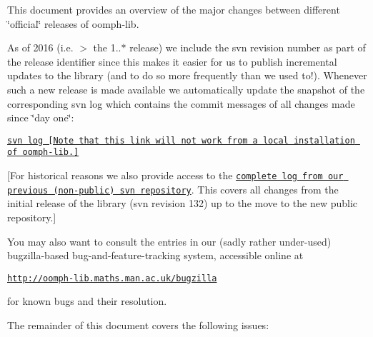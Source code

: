 This document provides an overview of the major changes between different \char`\"{}official\char`\"{} releases of {\ttfamily oomph-\/lib}.

As of 2016 (i.\+e. $>$ the 1..$\ast$ release) we include the svn revision number as part of the release identifier since this makes it easier for us to publish incremental updates to the library (and to do so more frequently than we used to!). Whenever such a new release is made available we automatically update the snapshot of the corresponding svn log which contains the commit messages of all changes made since \char`\"{}day one\char`\"{}\+:

\begin{center} \href{../../svn_log.txt}{\tt svn log \mbox{[}Note that this link will not work from a local installation of oomph-\/lib.\mbox{]}} \end{center} 

\mbox{[}For historical reasons we also provide access to the \href{../final_svn_log.txt}{\tt complete log from our previous (non-\/public) svn repository}. This covers all changes from the initial release of the library (svn revision 132) up to the move to the new public repository.\mbox{]}

You may also want to consult the entries in our (sadly rather under-\/used) bugzilla-\/based bug-\/and-\/feature-\/tracking system, accessible online at

\begin{center} \href{http://oomph-lib.maths.man.ac.uk/bugzilla}{\tt http\+://oomph-\/lib.\+maths.\+man.\+ac.\+uk/bugzilla} \end{center} 

for known bugs and their resolution.

The remainder of this document covers the following issues\+:


